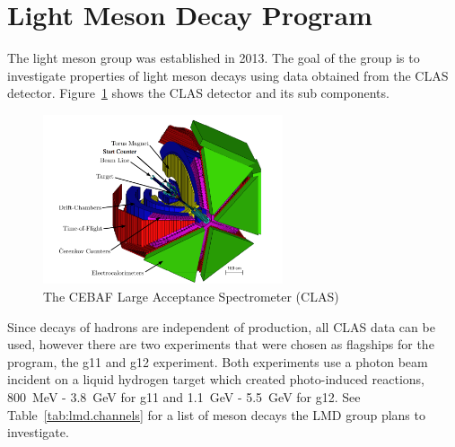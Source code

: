 \documentclass{aip-cp}
\begin{document}
\section{Light Meson Decay Program}
The light meson group was established in 2013. The goal of the group is to investigate properties of light meson decays using data obtained from the CLAS detector. Figure~\ref{fig:clas} shows the CLAS detector and its sub components.
\begin{figure}[h]
	\centerline{\includegraphics[width=200pt]{figures/clas_schematicIII.pdf}}
	\caption{The CEBAF Large Acceptance Spectrometer (CLAS) }
	\label{fig:clas}
\end{figure}
 Since decays of hadrons are independent of production, all CLAS data can be used, however there are two experiments that were chosen as flagships for the program, the g11 and g12 experiment. Both experiments use a photon beam incident on a liquid hydrogen target which created photo-induced reactions, 800~MeV - 3.8~GeV for g11 and 1.1~GeV - 5.5~GeV for g12.  See Table~\ref{tab:lmd.channels} for a list of meson decays the LMD group plans to investigate.

\end{document}
